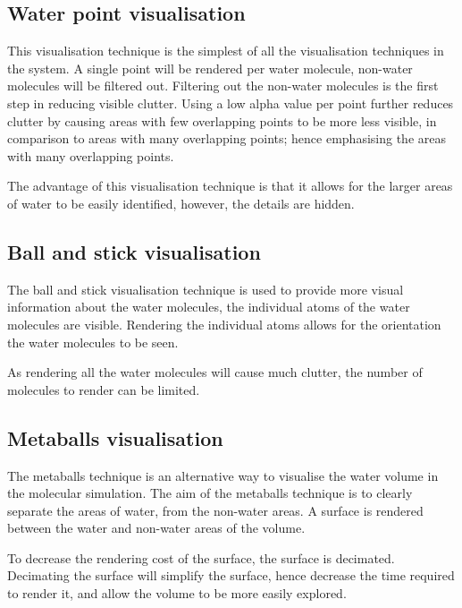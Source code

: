 
\subsection{Water point visualisation}
\label{sub:design_waterpoint}

This visualisation technique is the simplest of all the visualisation
techniques in the system. A single point will be rendered per water molecule,
non-water molecules will be filtered out. Filtering out the non-water molecules
is the first step in reducing visible clutter. Using a low alpha value per
point further reduces clutter by causing areas with few overlapping points to
be more less visible, in comparison to areas with many overlapping points;
hence emphasising the areas with many overlapping points.

The advantage of this visualisation technique is that it allows for the larger
areas of water to be easily identified, however, the details are hidden.


\subsection{Ball and stick visualisation}
\label{sub:design_ballstick}

The ball and stick visualisation technique is used to provide more visual
information about the water molecules, the individual atoms of the water
molecules are visible. Rendering the individual atoms allows for the
orientation the water molecules to be seen.

As rendering all the water molecules will cause much clutter, the number of
molecules to render can be limited.


\subsection{Metaballs visualisation}
\label{sub:design_metaballs}

The metaballs technique is an alternative way to visualise the water volume in
the molecular simulation. The aim of the metaballs technique is to clearly
separate the areas of water, from the non-water areas. A surface is rendered
between the water and non-water areas of the volume.

To decrease the rendering cost of the surface, the surface is decimated.
Decimating the surface will simplify the surface, hence decrease the time
required to render it, and allow the volume to be more easily explored.

